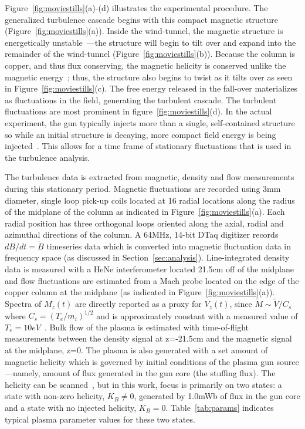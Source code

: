 \documentclass[manuscript]{aastex}
\begin{document}
Figure~\ref{fig:moviestills}(a)-(d) illustrates the experimental procedure. The generalized turbulence cascade begins with this compact magnetic structure (Figure~\ref{fig:moviestills}(a)). Inside the wind-tunnel, the magnetic structure is energetically unstable~\citep{bon81,jar94}---the structure will begin to tilt over and expand into the remainder of the wind-tunnel (Figure~\ref{fig:moviestills}(b)). Because the column is copper, and thus flux conserving, the magnetic helicity is conserved unlike the magnetic energy~\citep{tay86}; thus, the structure also begins to twist as it tilts over as seen in Figure~\ref{fig:moviestills}(c). The free energy released in the fall-over materializes as fluctuations in the field, generating the turbulent cascade. The turbulent fluctuations are most prominent in figure~\ref{fig:moviestills}(d). In the actual experiment, the gun typically injects more than a single, self-contained structure so while an initial structure is decaying, more compact field energy is being injected~\citep{bar86}. This allows for a time frame of stationary fluctuations that is used in the turbulence analysis.

The turbulence data is extracted from magnetic, density and flow measurements during this stationary period. Magnetic fluctuations are recorded using 3mm diameter, single loop pick-up coils located at 16 radial locations along the radius of the midplane of the column as indicated in Figure~\ref{fig:moviestills}(a). Each radial position has three orthogonal loops oriented along the axial, radial and azimuthal directions of the column. A 64MHz, 14-bit DTaq digitizer records $dB/dt = \dot{B}$ timeseries data which is converted into magnetic fluctuation data in frequency space (as discussed in Section~\ref{sec:analysis}). Line-integrated density data is measured with a HeNe interferometer located 21.5cm off of the midplane and flow fluctuations are estimated from a Mach probe located on the edge of the copper column at the midplane (as indicated in Figure~\ref{fig:moviestills}(a)). Spectra of $M_{z}(t)$ are directly reported as a proxy for $V_{z}(t)$, since $\tilde{M}\sim \tilde{V}/C_{s}$ where $C_{s}=(T_{e}/m_{i})^{1/2}$ and is approximately constant with a measured value of $T_{e}=10eV$~\citep{zha11, sch14b}. Bulk flow of the plasma is estimated with time-of-flight measurements between the density signal at z=-21.5cm and the magnetic signal at the midplane, z=0. The plasma is also generated with a set amount of magnetic helicity which is governed by initial conditions of the plasma gun source---namely, amount of flux generated in the gun core (the stuffing flux). The helicity can be scanned~\citep{sch14b}, but in this work, focus is primarily on two states: a state with non-zero helicity, $K_{B}\neq 0$, generated by 1.0mWb of flux in the gun core and a state with no injected helicity, $K_{B}=0$. Table~\ref{tab:params} indicates typical plasma parameter values for these two states.
\end{document}
